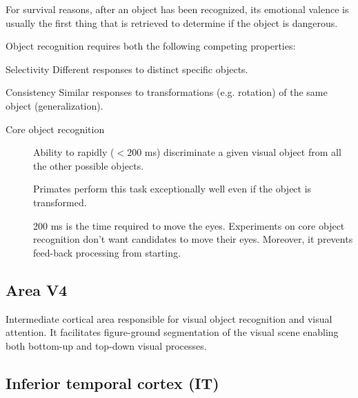 \begin{remark}
    For survival reasons, after an object has been recognized, 
    its emotional valence is usually the first thing that is retrieved to determine if the object is dangerous.
\end{remark}


Object recognition requires both the following competing properties:
\begin{descriptionlist}
    \item[Selectivity] 
        Different responses to distinct specific objects.

    \item[Consistency] 
        Similar responses to transformations (e.g. rotation) of the same object (generalization).
\end{descriptionlist}

\begin{description}
    \item[Core object recognition] 
        Ability to rapidly ($< 200$ ms) discriminate a given visual object from all the other possible objects.
        \begin{remark}
            Primates perform this task exceptionally well even if the object is transformed.
        \end{remark}

        \begin{remark}
            200 ms is the time required to move the eyes. Experiments on core object recognition don't want candidates to move their eyes.
            Moreover, it prevents feed-back processing from starting.
        \end{remark}
\end{description}


\subsection{Area V4}

Intermediate cortical area responsible for visual object recognition and visual attention.
It facilitates figure-ground segmentation of the visual scene enabling both bottom-up and top-down visual processes.


\subsection{Inferior temporal cortex (IT)}

